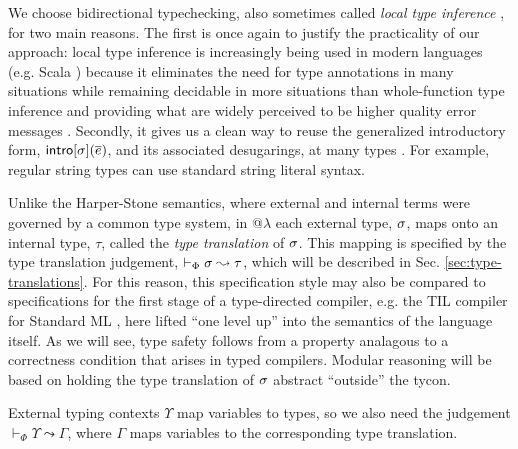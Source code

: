 \documentclass[10pt,preprint]{sigplanconf}
\begin{document}
We choose bidirectional typechecking, also sometimes called \emph{local type inference} \cite{Pierce:2000:LTI:345099.345100}, for two main reasons. The first is once again to justify the practicality of our approach: local type inference is increasingly being used in modern languages (e.g. Scala \cite{OdeZenZen01}) because it eliminates the need for type annotations in many situations while remaining decidable in more situations than whole-function type inference and providing what are widely perceived to be higher quality error messages \cite{journals/jfp/JonesVWS07}. Secondly, it  gives us a clean way to reuse the generalized introductory form, ${\sf intro}[\sigma](\overline{e})$, and its associated desugarings, at many types \cite{TSLs}. For example, regular string types can use standard string literal syntax. 

Unlike the Harper-Stone semantics, where external and internal terms were governed by a common type system, in @$\lambda$ each external type, $\sigma$, maps onto an internal type, $\tau$, called the \emph{type translation} of $\sigma$. This mapping is specified by the  type translation judgement, $\vdash_\Phi \sigma \leadsto \tau$, which will be described in Sec. \ref{sec:type-translations}. 
For this reason, this specification style may also be compared to specifications for the first stage of a type-directed compiler, e.g. the TIL compiler for Standard ML \cite{tarditi+:til-OLD}, here lifted ``one level up'' into the semantics of the language itself. As we will see, type safety follows from a property analagous to a correctness condition that arises in typed compilers. Modular reasoning will be based on holding the type translation of $\sigma$ abstract ``outside'' the tycon.

External typing contexts $\Upsilon$ map variables to types, so we also need the judgement $\vdash_\Phi \Upsilon \leadsto \Gamma$, where $\Gamma$ maps variables to the corresponding type translation.
\end{document}
